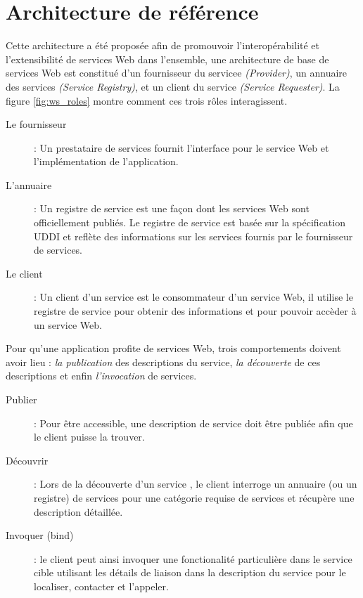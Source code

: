 \section{Architecture de référence}
\label{sec:reference-arch}
Cette architecture a été proposée afin de promouvoir
l'interopérabilité et l'extensibilité de services Web dans
l'ensemble, une architecture de base de services Web est constitué
d'un fournisseur du servicee \textit{(Provider)}, un annuaire des
services \textit{(Service Registry)}, et un client du service
\textit{(Service Requester)}. La figure \ref{fig:ws_roles} montre
comment ces trois rôles interagissent.



\renewcommand{\descriptionlabel}[1]{\hspace{1cm}\textbullet~\textsf{#1}}
\begin{description}
\item[Le fournisseur]: Un prestataire de services fournit l'interface
  pour le service Web et l'implémentation de l'application.

\item[L'annuaire]: Un registre de service est une façon dont les
  services Web sont officiellement publiés. Le registre de service est
  basée sur la spécification \textsc{UDDI} et reflète des informations
  sur les services fournis par le fournisseur de services.

\item[Le client]: Un client d'un service est le consommateur d'un
  service Web, il utilise le registre de service pour obtenir des
  informations et pour pouvoir accèder à un service Web.
\end{description}
\enddescription

Pour qu'une application profite de services Web, trois comportements
doivent avoir lieu : \textit{la publication} des descriptions du
service, \textit{la découverte} de ces descriptions et enfin
\textit{l'invocation} de services.

\renewcommand{\descriptionlabel}[1]{\hspace{1cm}\textbullet~\textsf{#1}}
\begin{description}
\item[Publier]: Pour être accessible, une description de service doit
  être publiée afin que le client puisse la trouver.

\item[Découvrir]: Lors de la découverte d'un service , le client
  interroge un annuaire (ou un registre) de services pour une
  catégorie requise de services et récupère une description
  détaillée.

\item[Invoquer (bind)]: le client peut ainsi invoquer une
  fonctionalité particulière dans le service cible utilisant les
  détails de liaison dans la description du service pour le localiser,
  contacter et l'appeler.
\end{description}

